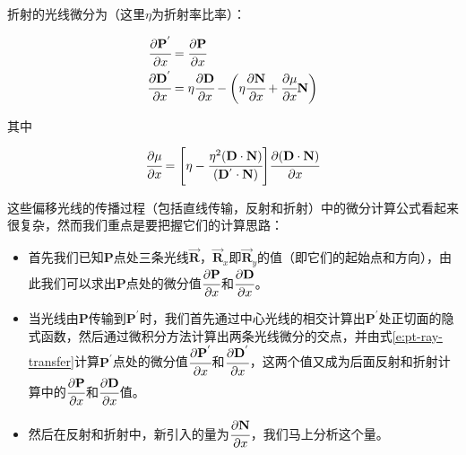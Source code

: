 \noindent 折射的光线微分为（这里$\eta$为折射率比率）：

\begin{equation}
	\begin{aligned}
		 \cfrac{{\rm \partial}\mathbf{P}^{'}}{{\rm \partial} x}&= \cfrac{{\rm \partial}\mathbf{P}}{{\rm \partial} x}\\
		 \cfrac{{\rm \partial}\mathbf{D}^{'}}{{\rm \partial} x}&=\eta \cfrac{{\rm \partial}\mathbf{D}}{{\rm \partial} x}-\bigg(\eta \cfrac{{\rm \partial}\mathbf{N}}{{\rm \partial} x}+ \cfrac{{\rm \partial}\mu }{{\rm \partial} x}\mathbf{N}\bigg)
	\end{aligned}
\end{equation}

\noindent 其中

\begin{equation}
	 \cfrac{{\rm \partial}\mu }{{\rm \partial} x}=\Bigg[ \eta- \cfrac{\eta^{2}(\mathbf{D}\cdot\mathbf{N})}{(\mathbf{D}^{'}\cdot\mathbf{N})} \Bigg] \cfrac{{\rm \partial} (\mathbf{D}\cdot\mathbf{N})}{{\rm \partial} x}
\end{equation}

\noindent 这些偏移光线的传播过程（包括直线传输，反射和折射）中的微分计算公式看起来很复杂，然而我们重点是要把握它们的计算思路：

\begin{itemize}
	\item 首先我们已知$\mathbf{P}$点处三条光线$\overrightarrow{\mathbf{R}}$，$\overrightarrow{\mathbf{R}}_x$即$\overrightarrow{\mathbf{R}}_y$的值（即它们的起始点和方向），由此我们可以求出$\mathbf{P}$点处的微分值$ \cfrac{{\rm \partial}\mathbf{P}}{{\rm \partial} x}$和$ \cfrac{{\rm \partial}\mathbf{D}}{{\rm \partial} x}$。
	\item 当光线由$\mathbf{P}$传输到$\mathbf{P}^{'}$时，我们首先通过中心光线的相交计算出$\mathbf{P}^{'}$处正切面的隐式函数，然后通过微积分方法计算出两条光线微分的交点，并由式\ref{e:pt-ray-transfer}计算$\mathbf{P}^{'}$点处的微分值$ \cfrac{{\rm \partial}\mathbf{P}^{'}}{{\rm \partial} x}$和$ \cfrac{{\rm \partial}\mathbf{D}^{'}}{{\rm \partial} x}$，这两个值又成为后面反射和折射计算中的$ \cfrac{{\rm \partial}\mathbf{P}}{{\rm \partial} x}$和$ \cfrac{{\rm \partial}\mathbf{D}}{{\rm \partial} x}$值。
	\item 然后在反射和折射中，新引入的量为$ \cfrac{{\rm \partial} \mathbf{N}}{{\rm \partial} x}$，我们马上分析这个量。
\end{itemize}

